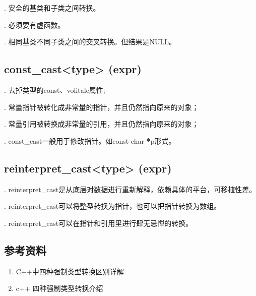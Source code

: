 \documentclass[letterpaper,10pt,english]{sphinxmanual}
\begin{document}
. 安全的基类和子类之间转换。

. 必须要有虚函数。

. 相同基类不同子类之间的交叉转换。但结果是NULL。


\subsection{const\_cast\textless{}type\textgreater{} (expr)}
\label{\detokenize{cpp/10_cast:const-cast-type-expr}}
. 去掉类型的const、volitale属性;

. 常量指针被转化成非常量的指针，并且仍然指向原来的对象；

. 常量引用被转换成非常量的引用，并且仍然指向原来的对象；

. const\_cast一般用于修改指针。如const char {\color{red}\bfseries{}*}p形式。


\subsection{reinterpret\_cast\textless{}type\textgreater{} (expr)}
\label{\detokenize{cpp/10_cast:reinterpret-cast-type-expr}}
. reinterpret\_cast是从底层对数据进行重新解释，依赖具体的平台，可移植性差。

. reinterpret\_cast可以将整型转换为指针，也可以把指针转换为数组。

. reinterpret\_cast可以在指针和引用里进行肆无忌惮的转换。


\subsection{参考资料}
\label{\detokenize{cpp/10_cast:id4}}\begin{enumerate}
\item {} 
C++中四种强制类型转换区别详解

\end{enumerate}
\begin{quote}

\end{quote}
\begin{enumerate}
\setcounter{enumi}{1}
\item {} 
c++ 四种强制类型转换介绍

\end{enumerate}
\begin{quote}

\end{quote}
\end{document}
